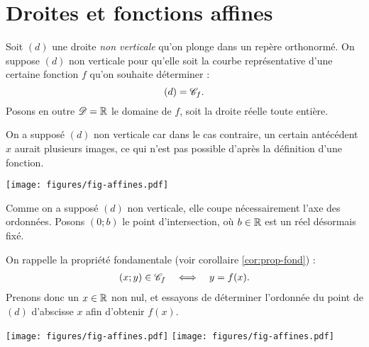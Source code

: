
\chapter{Droites et fonctions affines}





Soit $(d)$ une droite \emph{non verticale} qu'on plonge dans un repère orthonormé.
On suppose $(d)$ non verticale pour qu'elle soit la courbe représentative d'une certaine fonction $f$ qu'on souhaite déterminer : \[(d) = \mathcal{C}_f. \]
Posons en outre $\mathcal{D} = \mathbb{R}$ le domaine de $f$, soit la droite réelle toute entière.

On a supposé $(d)$ non verticale car dans le cas contraire, un certain antécédent $x$ aurait plusieurs images, ce qui n'est pas possible d'après la définition d'une fonction.


	\begin{center}
	\texttt{[image: figures/fig-affines.pdf]}
	\end{center}

Comme on a supposé $(d)$ non verticale, elle coupe nécessairement l'axe des ordonnées.
Posons $(0; b)$ le point d'intersection, où $b\in\mathbb{R}$ est un réel désormais fixé.

On rappelle la propriété fondamentale (voir corollaire \ref{cor:prop-fond}) : 
	\begin{align*}
		(x;y) \in \mathcal{C}_f && \iff && y = f(x).
	\end{align*}
Prenons donc un $x \in \mathbb{R}$ non nul, et essayons de déterminer l'ordonnée du point de $(d)$ d'abscisse $x$ afin d'obtenir $f(x)$.

	\begin{center}
	\texttt{[image: figures/fig-affines.pdf]}
	\hfill
	\texttt{[image: figures/fig-affines.pdf]}
	\end{center}
	
